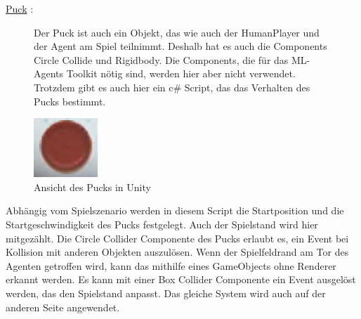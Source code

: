 \underline{Puck} :

\begin{figure} [h]

\begin{minipage}[t]{0.6\textwidth}
\vspace{0pt}
Der Puck ist auch ein Objekt, das wie auch der HumanPlayer und der Agent am Spiel teilnimmt. Deshalb hat es auch die Components Circle Collide und Rigidbody.  Die Components, die für das ML-Agents Toolkit nötig sind, werden hier aber nicht verwendet. Trotzdem gibt es auch hier ein c\# Script, das das Verhalten des Pucks bestimmt.
\end{minipage}
\hspace{0.1\textwidth}
\begin{minipage}[t]{0.2\textwidth}
\vspace{0pt}
\includegraphics[width=\textwidth]{images/puck_unity}
 \caption{Ansicht des Pucks in Unity}
 \label{unity_puck}
\end{minipage}
\end{figure}
Abhängig vom Spielszenario werden in diesem Script die Startposition und die Startgeschwindigkeit des Pucks festgelegt. Auch der Spielstand wird hier mitgezählt. Die Circle Collider Componente  des Pucks erlaubt es, ein Event bei Kollision mit anderen Objekten auszulösen. Wenn der Spielfeldrand am Tor des Agenten getroffen wird, kann das mithilfe eines GameObjects ohne Renderer erkannt werden. Es kann mit einer Box Collider Componente ein Event ausgelöst werden, das den Spielstand anpasst. Das gleiche System wird auch auf der anderen Seite angewendet. \\

